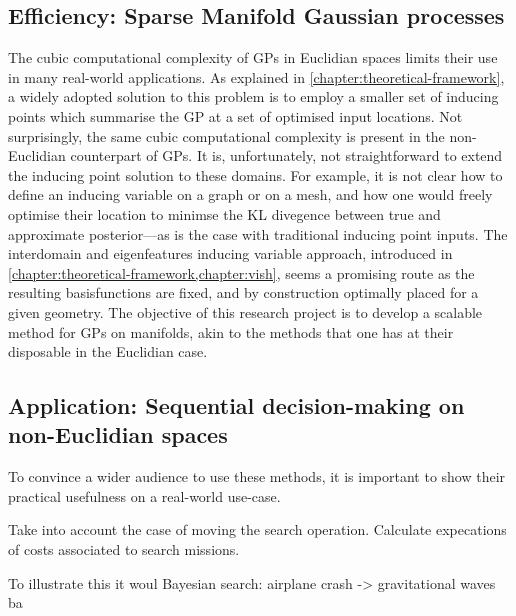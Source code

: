 \subsection{Efficiency: Sparse Manifold Gaussian processes}

The cubic computational complexity of GPs in Euclidian spaces limits their use in many real-world applications. As explained in \cref{chapter:theoretical-framework}, a widely adopted solution to this problem is to employ a smaller set of inducing points which summarise the GP at a set of optimised input locations. Not surprisingly, the same cubic computational complexity is present in the non-Euclidian counterpart of GPs. It is, unfortunately, not straightforward to extend the inducing point solution to these domains. For example, it is not clear how to define an inducing variable on a graph or on a mesh, and how one would freely optimise their location to minimse the KL divegence between true and approximate posterior---as is the case with traditional inducing point inputs. The interdomain and eigenfeatures inducing variable approach, introduced in \cref{chapter:theoretical-framework,chapter:vish}, seems a promising route as the resulting basisfunctions are fixed, and by construction optimally placed for a given geometry. The objective of this research project is to develop a scalable method for GPs on manifolds, akin to the methods that one has at their disposable in the Euclidian case. 

\subsection{Application: Sequential decision-making on non-Euclidian spaces}

To convince a wider audience to use these methods, it is important to show their practical usefulness on a real-world use-case.


Take into account the case of moving the search operation. Calculate expecations of costs associated to search missions. %

To illustrate this it woul
Bayesian search: airplane crash -> gravitational waves
ba



